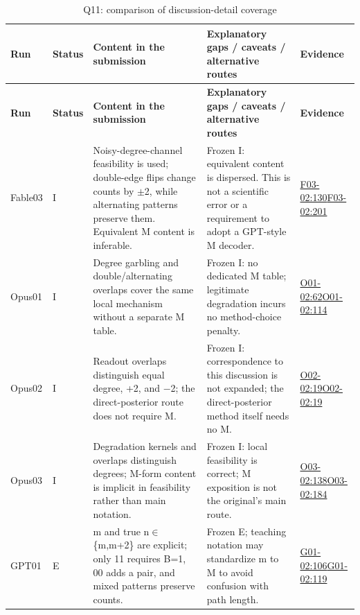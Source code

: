 \documentclass[11pt,a4paper]{article}
\begin{document}
{\fontsize{9.0}{12.6}\selectfont
\setlength{\tabcolsep}{2.5pt}
\begin{longtable}{>{\raggedright\arraybackslash}p{}>{\raggedright\arraybackslash}p{}>{\raggedright\arraybackslash}p{}>{\raggedright\arraybackslash}p{}>{\raggedright\arraybackslash}p{}}
\caption{Q11: comparison of discussion-detail coverage}\\
\toprule
\textbf{Run} & \textbf{Status} & \textbf{Content in the submission} & \textbf{Explanatory gaps /\allowbreak{} caveats /\allowbreak{} alternative routes} & \textbf{Evidence}\tabularnewline
\midrule
\endfirsthead
\toprule
\textbf{Run} & \textbf{Status} & \textbf{Content in the submission} & \textbf{Explanatory gaps /\allowbreak{} caveats /\allowbreak{} alternative routes} & \textbf{Evidence}\tabularnewline
\midrule
\endhead
{}Fable03 & I & Noisy-degree-channel feasibility is used; double-edge flips change counts by \ensuremath{\pm}2,\allowbreak{} while alternating patterns preserve them. Equivalent M content is inferable. & Frozen I: equivalent content is dispersed. This is not a scientific error or a requirement to adopt a GPT-style M decoder. & \hyperref[src:F03-02]{F03-02:130}\newline \hyperref[src:F03-02]{F03-02:201}\tabularnewline
{}Opus01 & I & Degree garbling and double/\allowbreak{}alternating overlaps cover the same local mechanism without a separate M table. & Frozen I: no dedicated M table; legitimate degradation incurs no method-choice penalty. & \hyperref[src:O01-02]{O01-02:62}\newline \hyperref[src:O01-02]{O01-02:114}\tabularnewline
{}Opus02 & I & Readout overlaps distinguish equal degree,\allowbreak{} +2,\allowbreak{} and \ensuremath{-}2; the direct-posterior route does not require M. & Frozen I: correspondence to this discussion is not expanded; the direct-posterior method itself needs no M. & \hyperref[src:O02-02]{O02-02:19}\newline \hyperref[src:O02-02]{O02-02:19}\tabularnewline
{}Opus03 & I & Degradation kernels and overlaps distinguish degrees; M-form content is implicit in feasibility rather than main notation. & Frozen I: local feasibility is correct; M exposition is not the original’s main route. & \hyperref[src:O03-02]{O03-02:138}\newline \hyperref[src:O03-02]{O03-02:184}\tabularnewline
{}GPT01 & E & m and true n\ensuremath{\in}\{m,\allowbreak{}m+2\} are explicit; only 11 requires B=1,\allowbreak{} 00 adds a pair,\allowbreak{} and mixed patterns preserve counts. & Frozen E; teaching notation may standardize m to M to avoid confusion with path length. & \hyperref[src:G01-02]{G01-02:106}\newline \hyperref[src:G01-02]{G01-02:119}\tabularnewline

\end{longtable}}
\end{document}
